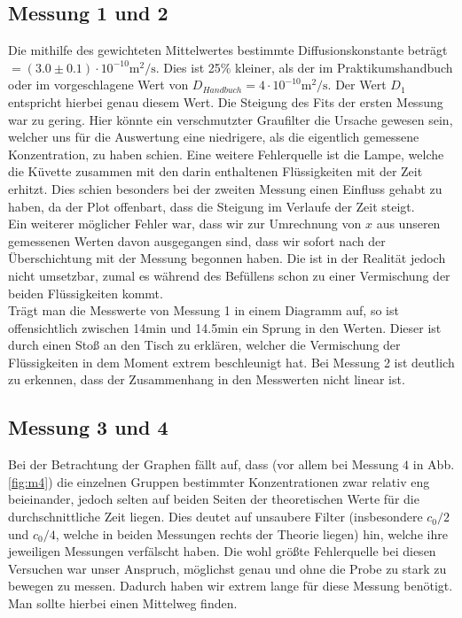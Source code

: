 \documentclass[12pt,a4paper,titlepage,headinclude,bibtotoc]{scrartcl}
\begin{document}
\subsection{Messung 1 und 2}
Die mithilfe des gewichteten Mittelwertes bestimmte Diffusionskonstante beträgt $=(3.0\pm 0.1)\cdot 10^{-10}\text{m}^2/\text{s}$.
Dies ist 25\% kleiner, als der im Praktikumshandbuch oder im \cite{LP} vorgeschlagene Wert von $D_{Handbuch}=4\cdot 10^{-10}\text{m}^2/\text{s}$.
Der Wert $D_1$ entspricht hierbei genau diesem Wert.
Die Steigung des Fits der ersten Messung war zu gering.
Hier könnte ein verschmutzter Graufilter die Ursache gewesen sein, welcher uns für die Auswertung eine niedrigere, als die eigentlich gemessene Konzentration, zu haben schien.
Eine weitere Fehlerquelle ist die Lampe, welche die Küvette zusammen mit den darin enthaltenen Flüssigkeiten mit der Zeit erhitzt.
Dies schien besonders bei der zweiten Messung einen Einfluss gehabt zu haben, da der Plot offenbart, dass die Steigung im Verlaufe der Zeit steigt.\\
Ein weiterer möglicher Fehler war, dass wir zur Umrechnung von $x$ aus unseren gemessenen Werten davon ausgegangen sind, dass wir sofort nach der Überschichtung mit der Messung begonnen haben.
Die ist in der Realität jedoch nicht umsetzbar, zumal es während des Befüllens schon zu einer Vermischung der beiden Flüssigkeiten kommt.\\

Trägt man die Messwerte von Messung 1 in einem Diagramm auf, so ist offensichtlich zwischen 14min und 14.5min ein Sprung in den Werten.
Dieser ist durch einen Stoß an den Tisch zu erklären, welcher die Vermischung der Flüssigkeiten in dem Moment extrem beschleunigt hat.
Bei Messung 2 ist deutlich zu erkennen, dass der Zusammenhang in den Messwerten nicht linear ist.

\subsection{Messung 3 und 4}
Bei der Betrachtung der Graphen fällt auf, dass (vor allem bei Messung $4$ in Abb. \ref{fig:m4}) die einzelnen Gruppen bestimmter Konzentrationen zwar relativ eng beieinander, jedoch selten auf beiden Seiten der theoretischen Werte für die durchschnittliche Zeit liegen.
Dies deutet auf unsaubere Filter (insbesondere $c_0/2$ und $c_0/4$, welche in beiden Messungen rechts der Theorie liegen) hin, welche ihre jeweiligen Messungen verfälscht haben.
Die wohl größte Fehlerquelle bei diesen Versuchen war unser Anspruch, möglichst genau und ohne die Probe zu stark zu bewegen zu messen.
Dadurch haben wir extrem lange für diese Messung benötigt.
Man sollte hierbei einen Mittelweg finden.
\end{document}
